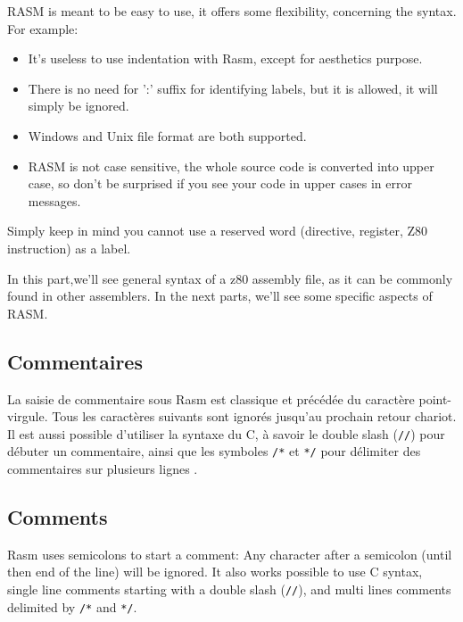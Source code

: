 \begin{xen}
RASM is meant to be easy to use, it offers some flexibility, concerning the syntax.  For example:
\begin{itemize}
\item It's useless to use indentation with Rasm, except for aesthetics purpose.
\item There is no need for ':' suffix for identifying labels, but it is allowed, it will simply be ignored.
\item Windows and Unix file format are both supported.
\item RASM is not case sensitive, the whole source code is converted into upper case, so don't be surprised if you see your code in upper cases in error messages.
\end{itemize}

Simply keep in mind you cannot use a reserved word (directive, register, Z80 instruction) as a label.

In this part,we'll see general syntax of a z80 assembly file, as it can be commonly found in other assemblers.
In the next parts, we'll see some specific aspects of RASM.

\end{xen}

\begin{xfr}
  \subsection{Commentaires}
  La saisie de commentaire sous Rasm est classique et précédée du caractère point-virgule.
  Tous les caractères suivants sont ignorés jusqu'au prochain retour chariot.
  Il est aussi possible d'utiliser la syntaxe du C, à savoir le double slash (\texttt{//}) pour débuter un commentaire, ainsi que les symboles \texttt{/*} et \texttt{*/} pour délimiter des commentaires sur plusieurs lignes .
\end{xfr}

\begin{xen}
  \subsection{Comments}
  Rasm uses semicolons to start a comment: Any character after a semicolon (until then end of the line) will be ignored. It also works possible to use C syntax, single line comments starting with a double slash (\texttt{//}), and multi lines comments delimited by \texttt{/*} and \texttt{*/}.
\end{xen}


